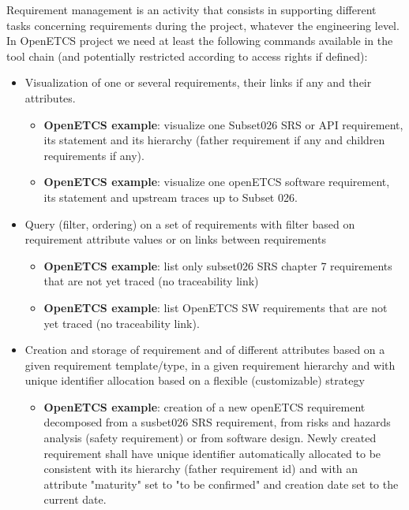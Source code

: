 \documentclass[11pt]{template/openetcs_report}
\begin{document}
Requirement management is an activity that consists in supporting different tasks concerning requirements during the project, whatever the engineering level. In OpenETCS project we need at least the following commands available in the tool chain (and potentially restricted according to access rights if defined):
\begin{itemize}

\item Visualization of one or several requirements, their links if any and their attributes. 
\begin{itemize} \item \textbf{OpenETCS example}: visualize one Subset026 SRS or API requirement, its statement and its hierarchy (father requirement if any and children requirements if any).
	\item \textbf{OpenETCS example}: visualize one openETCS software requirement, its statement and upstream traces up to Subset 026.\end{itemize}

\item Query (filter, ordering) on a set of requirements with filter based on requirement attribute values or on links between requirements
\begin{itemize} \item \textbf{OpenETCS example}: list only subset026 SRS chapter 7 requirements that are not yet traced (no traceability link)	\item \textbf{OpenETCS example}: list OpenETCS SW requirements that are not yet traced (no traceability link).
\end{itemize}

\item Creation and storage of requirement and of different attributes based on a given requirement template/type, in a given requirement hierarchy and with unique identifier allocation based on a flexible (customizable) strategy
\begin{itemize} \item \textbf{OpenETCS example}: creation of a new openETCS requirement decomposed from a susbet026 SRS requirement, from risks and hazards analysis (safety requirement) or from software design. Newly created requirement shall have unique identifier automatically allocated to be consistent with its hierarchy (father requirement id) and with an attribute "maturity" set to "to be confirmed" and creation date set to the current date.
\end{itemize}


\end{itemize}
\end{document}
